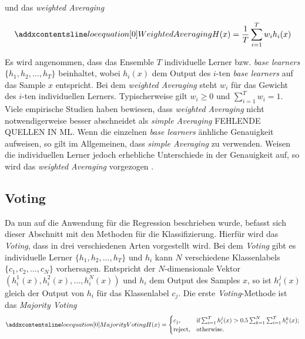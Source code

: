 und das \textit{weighted Averaging}

\begin{equation}
    \setequationentry{Weighted Averaging}{}
    \begin{gathered}
        H(x) = \frac{1}{T}\sum_{i=1}^{T}w_{i}h_{i}(x)
    \end{gathered}
    \label{eq:weightedAveraging}
\end{equation}

Es wird angenommen, dass das Ensemble $T$ individuelle Lerner bzw. \textit{base learners} $\{h_1, h_2,\dots,h_T\}$ beinhaltet, wobei $h_{i}(x)$ dem Output des $i$-ten \textit{base learners} auf das Sample $x$ entspricht. Bei dem \textit{weighted Averaging} steht $w_i$ für das Gewicht des $i$-ten individuellen Lerners. Typischerweise gilt $w_i \geqslant 0$ und $\sum_{i=1}^{T}w_i = 1$. Viele empirische Studien haben bewiesen, dass \textit{weighted Averaging} nicht notwendigerweise besser abschneidet als \textit{simple Averaging} FEHLENDE QUELLEN IN ML. Wenn die einzelnen \textit{base learners} änhliche Genauigkeit aufweisen, so gilt im Allgemeinen, dass \textit{simple Averaging} zu verwenden. Weisen die individuellen Lerner jedoch erhebliche Unterschiede in der Genauigkeit auf, so wird das \textit{weighted Averaging} vorgezogen \autocite[vgl. S.195]{Zhou.2021}.

\subsection{Voting}
Da nun auf die Anwendung für die Regression beschrieben wurde, befasst sich dieser Abschnitt mit den Methoden für die Klassifizierung. Hierfür wird das \textit{Voting}, dass in drei verschiedenen Arten vorgestellt wird. Bei dem \textit{Voting} gibt es individuelle Lerner $\{h_1, h_2,\dots,h_T\}$ und $h_i$ kann $N$ verschiedene Klassenlabels $\{c_1, c_2,\dots, c_N\}$ vorhersagen. Entspricht der $N$-dimensionale Vektor $(h_{i}^{1}(x), h_{i}^{2}(x),\dots, h_{i}^{N}(x))$ und $h_i$ dem Output des Samples $x$, so ist $h_{i}^{j}(x)$ gleich der Output von $h_i$ für das Klassenlabel $c_j$. Die erste \textit{Voting}-Methode ist das \textit{Majority Voting}
\begin{equation}
    \setequationentry{Majority Voting}{}
    \begin{gathered}
        H(x) = \begin{cases}
            \text{$c_j$,} & \text{if} \sum_{i=1}^{T}h_{i}^{j}(x) > 0.5 \sum_{k=1}^{N}\sum_{i=1}^{T}h_{i}^{k}(x); \\
           \text{reject,} & \text{otherwise.}
        \end{cases}
    \end{gathered}
    \label{eq:majorityVoting}
\end{equation}

